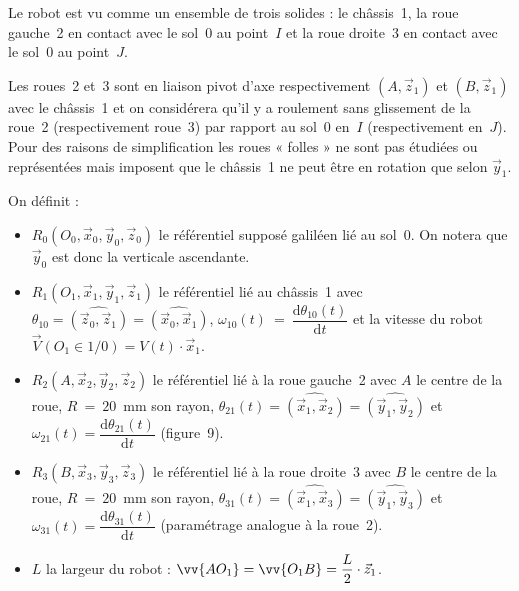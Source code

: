 Le robot est vu comme un ensemble de trois solides : le châssis~1, la roue gauche~2 en contact avec
le sol~0 au point~$I$ et la roue droite~3 en contact avec le sol~0 au point~$J$.

Les roues~2 et~3 sont en liaison pivot d'axe respectivement $(A,\vec{z}_1)$ et $(B,\vec{z}_1)$ avec le châssis~1 et on
considérera qu'il y a roulement sans glissement de la roue~2 (respectivement roue~3) par rapport au
sol~0 en~$I$ (respectivement en~$J$). Pour des raisons de simplification les roues « folles » ne sont pas
étudiées ou représentées mais imposent que le châssis~1 ne peut être en rotation que selon $\vec{y}_1$.

On définit :
\begin{itemize}
  \item $R_0(O_0,\vec{x}_0,\vec{y}_0,\vec{z}_0)$ le référentiel supposé galiléen lié au sol~0. On notera que $\vec{y}_0$ est donc la verticale
    ascendante.
  \item $R_1(O_1,\vec{x}_1,\vec{y}_1,\vec{z}_1)$ le référentiel lié au châssis~1 avec $\theta_{10} = \widehat{(\vec{z}_0,\vec{z}_1)} = \widehat{(\vec{x}_0,\vec{x}_1)}$, \linebreak
  $\omega_{10}(t)~=~\dfrac{\mathrm{d}\theta_{10}(t)}{\mathrm{d}t}$ et la vitesse du robot $\vec{V}(O_1 \in 1/0) = V(t)\cdot\vec{x}_1$.
  \item $R_2(A,\vec{x}_2,\vec{y}_2,\vec{z}_2)$ le référentiel lié à la roue gauche~2 avec $A$ le centre de la roue, \linebreak
    $R~=~20$~mm son rayon, $\theta_{21}(t) = \widehat{(\vec{x}_1,\vec{x}_2)} = \widehat{(\vec{y}_1,\vec{y}_2)}$ et $\omega_{21}(t) = \dfrac{\mathrm{d}\theta_{21}(t)}{\mathrm{d}t}$ (figure~9).
  \item $R_3(B,\vec{x}_3,\vec{y}_3,\vec{z}_3)$ le référentiel lié à la roue droite~3 avec $B$ le centre de la roue, \linebreak
    $R~=~20$~mm son rayon, $\theta_{31}(t) = \widehat{(\vec{x}_1,\vec{x}_3)} = \widehat{(\vec{y}_1,\vec{y}_3)}$ et $\omega_{31}(t) = \dfrac{\mathrm{d}\theta_{31}(t)}{\mathrm{d}t}$ (paramétrage analogue à la roue~2).
  \item $L$ la largeur du robot : $\vv{AO_1} = \vv{O_1B} = \dfrac{L}{2}\cdot\vec{z}_1$.
\end{itemize}

\medskip


